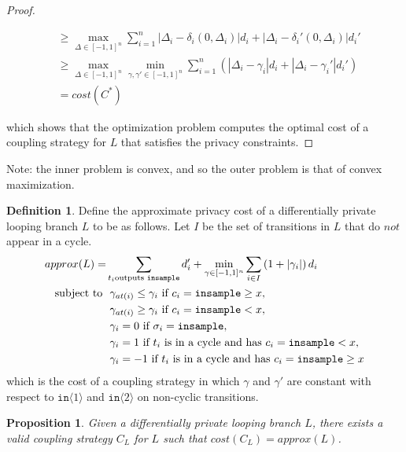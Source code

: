 \documentclass[12pt]{article}
\newcommand{\gguard}[1][x]{\texttt{insample}\geq#1}
\newcommand{\lguard}[1][x]{\texttt{insample} < #1}
\newcommand{\brangle}[1]{\langle#1 \rangle}
\newtheorem{prop}[thm]{Proposition}
\theoremstyle{definition}
\newtheorem{defn}[thm]{Definition}
\begin{document}
\begin{proof}
\begin{enumerate}
\begin{align*}
            &\geq \max_{\Delta \in [-1, 1]^n} \sum_{i = 1}^n  |\Delta_i - \delta_i(0, \Delta_i)| d_i + |\Delta_i - \delta_i'(0, \Delta_i)|d_i' \\
            &\geq \max_{\Delta \in [-1, 1]^n} \min_{\gamma, \gamma' \in [-1, 1]^n} \sum_{i = 1}^n \left(|\Delta_i - \gamma_i| d_i + |\Delta_i - \gamma_i'|d_i' \right)\\
            &= cost(C^*)
        \end{align*}
    \end{enumerate}
    which shows that the optimization problem computes the optimal cost of a coupling strategy for $L$ that satisfies the privacy constraints.
\end{proof}

Note: the inner problem is convex, and so the outer problem is that of convex maximization. 

\begin{defn}
    Define the approximate privacy cost of a differentially private looping branch $L$ to be as follows. Let $I$ be the set of transitions in $L$ that do $\textit{not}$ appear in a cycle.  
    \begin{align*} 
        approx(L) = &\sum_{t_i \text{outputs \texttt{insample}}} d_i' + \min_{\gamma \in [-1, 1]^n} \sum_{i \in I} \left(1 + |\gamma_i| \right) d_i  \\
            \text{subject to } 
            &\ \gamma_{at(i)} \leq \gamma_i \text{ if } c_i = \gguard, \\
            &\ \gamma_{at(i)} \geq \gamma_i \text{ if } c_i = \lguard, \\
            &\ \gamma_i = 0 \text{ if } \sigma_i = \texttt{insample}, \\
            &\ \gamma_i = 1 \text{ if } t_i \text{ is in a cycle and has } c_i = \lguard,\\ 
            &\ \gamma_i = -1 \text{ if } t_i \text{ is in a cycle and has } c_i = \gguard
    \end{align*}
    which is the cost of a coupling strategy in which $\gamma$ and $\gamma'$ are constant with respect to $\texttt{in}\brangle{1}$ and $\texttt{in}\brangle{2}$ on non-cyclic transitions. 
\end{defn}

\begin{prop}
    Given a differentially private looping branch $L$, there exists a valid coupling strategy $C_L$ for $L$ such that $cost(C_L) = approx(L)$.
\end{prop}
\end{document}
